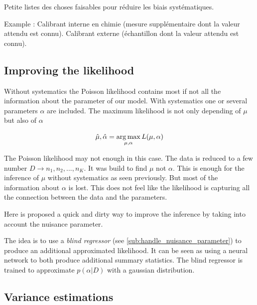 
Petite listes des choses faisables pour réduire les biais systématiques. 


Example : Calibrant interne en chimie (mesure supplémentaire dont la valeur attendu est connu). Calibrant externe (échantillon dont la valeur attendu est connu).






\subsection{Improving the likelihood} %
\label{sub:improving_the_likelihood}



Without systematics the Poisson likelihood contains most if not all the information about the parameter of our model.
With systematics one or several parameters $\alpha$ are included.
The maximum likelihood is not only depending of $\mu$ but also of $\alpha$

\begin{equation}
	\hat \mu, \hat \alpha = \operatorname*{arg\,max}_{\mu, \alpha} L(\mu, \alpha)
\end{equation}

The Poisson likelihood may not enough in this case.
The data is reduced to a few number $D \to n_1, n_2, ..., n_K$.
It was build to find $\mu$ not $\alpha$.
This is enough for the inference of $\mu$ without systematics as seen previously.
But most of the information about $\alpha$ is lost.
This does not feel like the likelihood is capturing all the connection between the data and the parameters.

Here is proposed a quick and dirty way to improve the inference by taking into account the nuisance parameter.

The idea is to use a \emph{blind regressor} (see \autoref{sub:handle_nuisance_parameter}) to produce an additional approximated likelihood.
It can be seen as using a neural network to both produce additional summary statistics.
The blind regressor is trained to approximate $p(\alpha | D)$ with a gaussian distribution.







\subsection{Variance estimations} %
\label{sub:variance_estimations}

